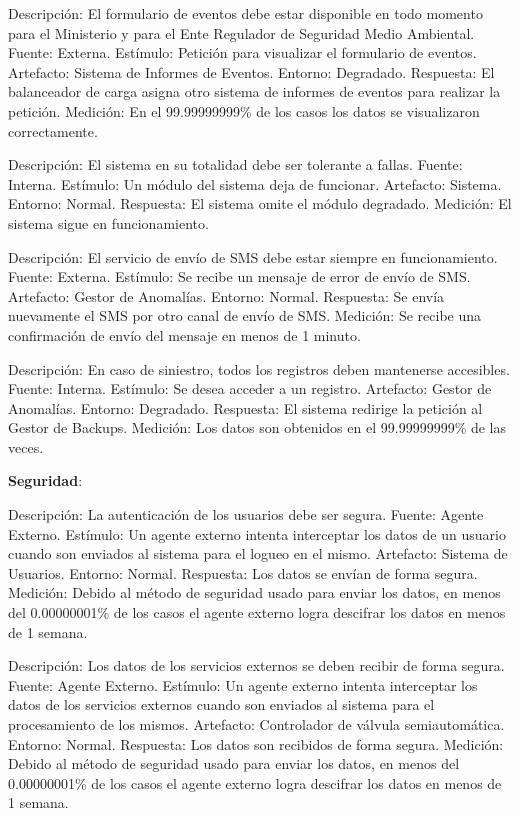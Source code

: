 \documentclass{article}
\theoremstyle{definition}
\theoremstyle{remark}
\begin{document}
Descripción: El formulario de eventos debe estar disponible en todo momento para el Ministerio y para el Ente Regulador de Seguridad Medio Ambiental.
Fuente: Externa.
Estímulo: Petición para visualizar el formulario de eventos.
Artefacto: Sistema de Informes de Eventos.
Entorno: Degradado.
Respuesta: El balanceador de carga asigna otro sistema de informes de eventos para realizar la petición.
Medición: En el 99.99999999\% de los casos los datos se visualizaron correctamente.

Descripción: El sistema en su totalidad debe ser tolerante a fallas.
Fuente: Interna.
Estímulo: Un módulo del sistema deja de funcionar.
Artefacto: Sistema.
Entorno: Normal.
Respuesta: El sistema omite el módulo degradado.
Medición: El sistema sigue en funcionamiento.

Descripción: El servicio de envío de SMS debe estar siempre en funcionamiento.
Fuente: Externa.
Estímulo: Se recibe un mensaje de error de envío de SMS.
Artefacto: Gestor de Anomalías.
Entorno: Normal.
Respuesta: Se envía nuevamente el SMS por otro canal de envío de SMS.
Medición: Se recibe una confirmación de envío del mensaje en menos de 1 minuto.

Descripción: En caso de siniestro, todos los registros deben mantenerse accesibles.
Fuente: Interna.
Estímulo: Se desea acceder a un registro.
Artefacto: Gestor de Anomalías.
Entorno: Degradado.
Respuesta: El sistema redirige la petición al Gestor de Backups.
Medición: Los datos son obtenidos en el 99.99999999\% de las veces.

\textbf{Seguridad}:

Descripción: La autenticación de los usuarios debe ser segura.
Fuente: Agente Externo.
Estímulo: Un agente externo intenta interceptar los datos de un usuario cuando son enviados al sistema para el logueo en el mismo.
Artefacto: Sistema de Usuarios.
Entorno: Normal.
Respuesta: Los datos se envían de forma segura.
Medición: Debido al método de seguridad usado para enviar los datos, en menos del 0.00000001\% de los casos el agente externo logra descifrar los datos en menos de 1 semana.

Descripción: Los datos de los servicios externos se deben recibir de forma segura.
Fuente: Agente Externo.
Estímulo: Un agente externo intenta interceptar los datos de los servicios externos cuando son enviados al sistema para el procesamiento de los mismos.
Artefacto: Controlador de válvula semiautomática.
Entorno: Normal.
Respuesta: Los datos son recibidos de forma segura.
Medición: Debido al método de seguridad usado para enviar los datos, en menos del 0.00000001\% de los casos el agente externo logra descifrar los datos en menos de 1 semana.
\end{document}
